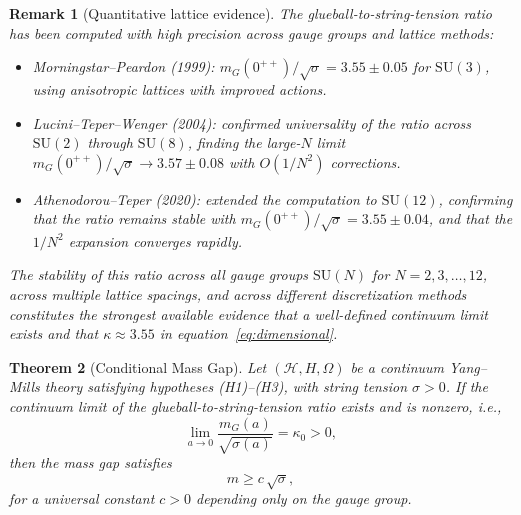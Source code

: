 \documentclass[11pt]{article}
\newtheorem{theorem}{Theorem}[section]
\newtheorem{remark}[theorem]{Remark}
\begin{document}
\begin{remark}[Quantitative lattice evidence]\label{rem:lattice-data}
The glueball-to-string-tension ratio has been computed with high
precision across gauge groups and lattice methods:
\begin{itemize}[nosep]
  \item Morningstar--Peardon \cite{MP} (1999):
    $m_G(0^{++})/\sqrt{\sigma} = 3.55 \pm 0.05$ for $\mathrm{SU}(3)$,
    using anisotropic lattices with improved actions.
  \item Lucini--Teper--Wenger \cite{LTW} (2004): confirmed universality
    of the ratio across $\mathrm{SU}(2)$ through $\mathrm{SU}(8)$, finding
    the large-$N$ limit $m_G(0^{++})/\sqrt{\sigma} \to 3.57 \pm 0.08$
    with $O(1/N^2)$ corrections.
  \item Athenodorou--Teper \cite{AT} (2020): extended the computation to
    $\mathrm{SU}(12)$, confirming that the ratio remains stable with
    $m_G(0^{++})/\sqrt{\sigma} = 3.55 \pm 0.04$, and that the
    $1/N^2$ expansion converges rapidly.
\end{itemize}
The stability of this ratio across \emph{all} gauge groups $\mathrm{SU}(N)$
for $N = 2, 3, \ldots, 12$, across multiple lattice spacings, and across
different discretization methods constitutes the strongest available evidence
that a well-defined continuum limit exists and that $\kappa \approx 3.55$
in equation~\eqref{eq:dimensional}.
\end{remark}

\begin{theorem}[Conditional Mass Gap]\label{thm:conditional-gap}
Let $(\mathcal{H}, H, \Omega)$ be a continuum Yang--Mills theory satisfying
hypotheses (H1)--(H3), with string tension $\sigma > 0$.  If the continuum
limit of the glueball-to-string-tension ratio exists and is nonzero, i.e.,
\begin{equation}\label{eq:continuum-ratio}
  \lim_{a \to 0} \frac{m_G(a)}{\sqrt{\sigma(a)}} = \kappa_0 > 0,
\end{equation}
then the mass gap satisfies
\begin{equation}\label{eq:conditional-bound}
  m \geq c\,\sqrt{\sigma},
\end{equation}
for a universal constant $c > 0$ depending only on the gauge group.
\end{theorem}
\end{document}
